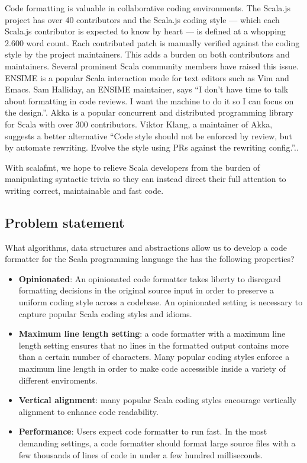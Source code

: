 Code formatting is valuable in collaborative coding environments.
The Scala.js project\autocite{_scala.js_????} has over 40 contributors and the Scala.js coding style\autocite{doeraene_scala.js_2015} --- which each Scala.js contributor is expected to know by heart --- is defined at a whopping 2.600 word count.
Each contributed patch is manually verified against the coding style by the project maintainers.
This adds a burden on both contributors and maintainers.
Several prominent Scala community members have raised this issue.
ENSIME\autocite{_ensime_????} is a popular Scala interaction mode for text editors such as Vim and Emacs.
Sam Halliday, an ENSIME maintainer, says ``I don't have time to talk about formatting in code reviews. I want the machine to do it so I can focus on the design.''\autocite{halliday_i_2016-1}.
Akka\autocite{_akka_????} is a popular concurrent and distributed programming library for Scala with over 300 contributors.
Viktor Klang, a maintainer of Akka, suggests a better alternative ``Code style should not be enforced by review, but by automate rewriting. Evolve the style using PRs against the rewriting config.''.\autocite{klang_code_2016}.

With scalafmt, we hope to relieve Scala developers from the burden of manipulating syntactic trivia so they can instead direct their full attention to writing correct, maintainable and fast code.

\subsection{Problem statement}

What algorithms, data structures and abstractions allow us to develop a code formatter for the Scala programming language the has the following properties?
\begin{itemize}
  \item 
    \textbf{Opinionated}:
    An opinionated code formatter takes liberty to disregard formatting decisions in the original source input in order to preserve a uniform coding style across a codebase.
    An opinionated setting is necessary to capture popular Scala coding styles and idioms.
  \item \textbf{Maximum line length setting}: a code formatter with a maximum line length setting ensures that no lines in the formatted output contains more than a certain number of characters.
    Many popular coding styles enforce a maximum line length in order to make code accesssible inside a variety of different enviroments.
  \item \textbf{Vertical alignment}: many popular Scala coding styles encourage vertically alignment to enhance code readability.
  \item \textbf{Performance}: Users expect code formatter to run fast.
    In the most demanding settings, a code formatter should format large source files with a few thousands of lines of code in under a few hundred milliseconds.

\end{itemize}

